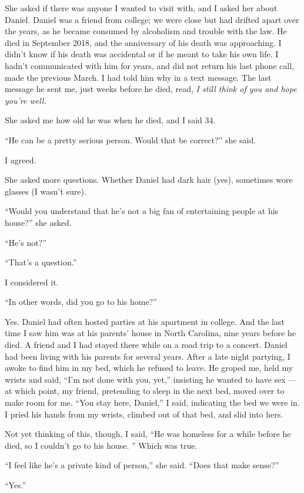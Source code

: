 She asked if there was anyone I wanted to visit with, and I asked her
about Daniel. Daniel was a friend from college; we were close but had
drifted apart over the years, as he became consumed by alcoholism and
trouble with the law. He died in September 2018, and the anniversary of
his death was approaching. I didn't know if his death was accidental or
if he meant to take his own life. I hadn't communicated with him for
years, and did not return his last phone call, made the previous March.
I had told him why in a text message. The last message he sent me, just
weeks before he died, read, \emph{I still think of you and hope you're
well.}

She asked me how old he was when he died, and I said 34.

``He can be a pretty serious person. Would that be correct?'' she said.

I agreed.

She asked more questions. Whether Daniel had dark hair (yes), sometimes
wore glasses (I wasn't sure).

``Would you understand that he's not a big fan of entertaining people at
his house?'' she asked.

``He's not?''

``That's a question.''

I considered it.

``In other words, did you go to his home?''

Yes. Daniel had often hosted parties at his apartment in college. And
the last time I saw him was at his parents' house in North Carolina,
nine years before he died. A friend and I had stayed there while on a
road trip to a concert. Daniel had been living with his parents for
several years. After a late night partying, I awoke to find him in my
bed, which he refused to leave. He groped me, held my wrists and said,
``I'm not done with you, yet,'' insisting he wanted to have sex --- at
which point, my friend, pretending to sleep in the next bed, moved over
to make room for me. ``You stay here, Daniel,'' I said, indicating the
bed we were in. I pried his hands from my wrists, climbed out of that
bed, and slid into hers.

Not yet thinking of this, though, I said, ``He was homeless for a while
before he died, so I couldn't go to his house. '' Which was true.

``I feel like he's a private kind of person,'' she said. ``Does that
make sense?''

``Yes.''

